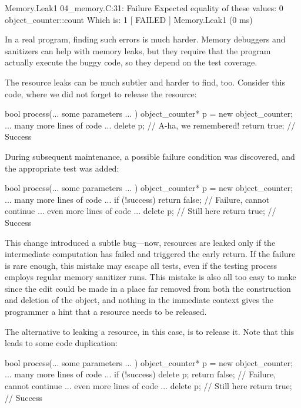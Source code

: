 \begin{code}
[ RUN      ] Memory.Leak1
04_memory.C:31: Failure
Expected equality of these values:
  0
  object_counter::count
    Which is: 1
[  FAILED  ] Memory.Leak1 (0 ms)
\end{code}

In a real program, finding such errors is much harder. Memory debuggers and sanitizers can help with memory leaks, but they require that the program actually execute the buggy code, so they depend on the test coverage.

The resource leaks can be much subtler and harder to find, too. Consider this code, where we did not forget to release the resource:

\begin{code}
bool process(... some parameters ... ) {
  object_counter* p = new object_counter;
  ... many more lines of code ...
  delete p;    // A-ha, we remembered!
  return true;    // Success
}
\end{code}

During subsequent maintenance, a possible failure condition was discovered, and the appropriate test was added:

\begin{code}
bool process(... some parameters ... ) {
  object_counter* p = new object_counter;
  ... many more lines of code ...
  if (!success) return false;   // Failure, cannot continue
  ... even more lines of code ...
  delete p;    // Still here
  return true;    // Success
}
\end{code}

This change introduced a subtle bug---now, resources are leaked only if the intermediate computation has failed and triggered the early return. If the failure is rare enough, this mistake may escape all tests, even if the testing process employs regular memory sanitizer runs. This mistake is also all too easy to make since the edit could be made in a place far removed from both the construction and deletion of the object, and nothing in the immediate context gives the programmer a hint that a resource needs to be released.

The alternative to leaking a resource, in this case, is to release it. Note that this leads to some code duplication:

\begin{code}
bool process(... some parameters ... ) {
  object_counter* p = new object_counter;
  ... many more lines of code ...
  if (!success) {
    delete p;
    return false;    // Failure, cannot continue
  }
  ... even more lines of code ...
  delete p;    // Still here
  return true;    // Success
}
\end{code}

